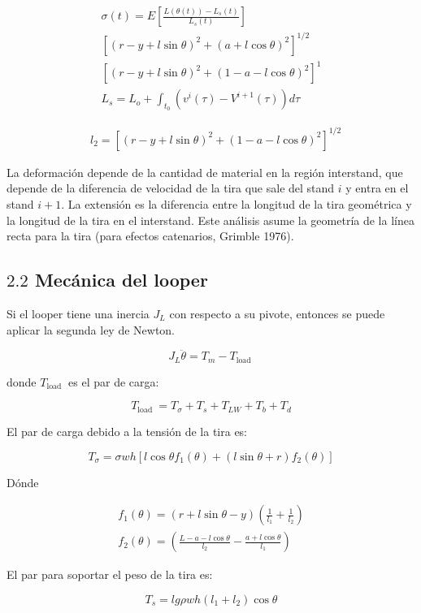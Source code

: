 $$
\begin{gathered}
\sigma(t)=E\left[\frac{L(\theta(t))-L_{s}(t)}{L_{s}(t)}\right] \\
{\left[(r-y+l \sin \theta)^{2}+(a+l \cos \theta)^{2}\right]^{1 / 2}} \\
{\left[(r-y+l \sin \theta)^{2}+(1-a-l \cos \theta)^{2}\right]^{1}} \\
L_{s}=L_{o}+\int_{t_{0}}\left(v^{i}(\tau)-V^{i+1}(\tau)\right) d \tau
\end{gathered}
$$

$$
\begin{aligned}
& l_{2}=\left[(r-y+l \sin \theta)^{2}+(1-a-l \cos \theta)^{2}\right]^{1 / 2}
\end{aligned}
$$

La deformación depende de la cantidad de material en la región interstand, que depende de la diferencia de velocidad de la tira que sale del stand $i$ y entra en el stand $i+1$. La extensión es la diferencia entre la longitud de la tira geométrica y la longitud de la tira en el interstand. Este análisis asume la geometría de la línea recta para la tira (para efectos catenarios, Grimble 1976).

\subsection{$2.2$ Mecánica del looper}
Si el looper tiene una inercia $J_{L}$ con respecto a su pivote, entonces se puede aplicar la segunda ley de Newton.

$$
J_{L} \ddot{\theta}=T_{m}-T_{\text {load }}
$$

donde $T_{\text {load }}$ es el par de carga:

$$
T_{\text {load }}=T_{\sigma}+T_{s}+T_{L W}+T_{b}+T_{d}
$$

El par de carga debido a la tensión de la tira es:

$$
T_{\sigma}=\sigma w h\left[l \cos \theta f_{1}(\theta)+(l \sin \theta+r) f_{2}(\theta)\right]
$$

Dónde

$$
\begin{array}{ll}
f_{1}(\theta)=(r+l \sin \theta-y)\left(\frac{1}{l_{1}}+\frac{1}{l_{2}}\right) \\
f_{2}(\theta)=\left(\frac{L-a-l \cos \theta}{l_{2}}-\frac{a+l \cos \theta}{l_{1}}\right)
\end{array}
$$

El par para soportar el peso de la tira es:

$$
T_{s}=l g \rho w h\left(l_{1}+l_{2}\right) \cos \theta
$$

